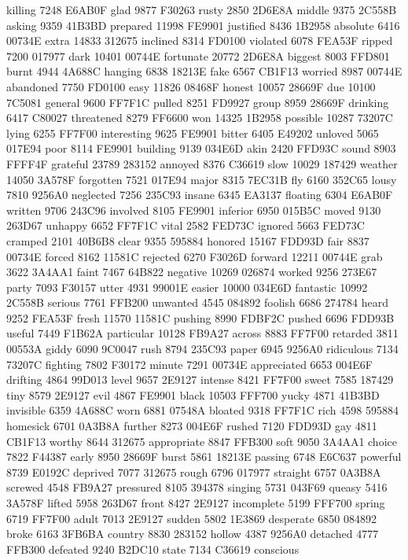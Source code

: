 killing 7248 E6AB0F glad 9877 F30263 rusty 2850 2D6E8A middle 9375
2C558B asking 9359 41B3BD prepared 11998 FE9901 justified 8436 1B2958
absolute 6416 00734E extra 14833 312675 inclined 8314 FD0100 violated
6078 FEA53F ripped 7200 017977 dark 10401 00744E fortunate 20772 2D6E8A
biggest 8003 FFD801 burnt 4944 4A688C hanging 6838 18213E fake 6567
CB1F13 worried 8987 00744E abandoned 7750 FD0100 easy 11826 08468F
honest 10057 28669F due 10100 7C5081 general 9600 FF7F1C pulled 8251
FD9927 group 8959 28669F drinking 6417 C80027 threatened 8279 FF6600
won 14325 1B2958 possible 10287 73207C lying 6255 FF7F00 interesting
9625 FE9901 bitter 6405 E49202 unloved 5065 017E94 poor 8114 FE9901
building 9139 034E6D akin 2420 FFD93C sound 8903 FFFF4F grateful 23789
283152 annoyed 8376 C36619 slow 10029 187429 weather 14050 3A578F
forgotten 7521 017E94 major 8315 7EC31B fly 6160 352C65 lousy 7810
9256A0 neglected 7256 235C93 insane 6345 EA3137 floating 6304 E6AB0F
written 9706 243C96 involved 8105 FE9901 inferior 6950 015B5C moved
9130 263D67 unhappy 6652 FF7F1C vital 2582 FED73C ignored 5663 FED73C
cramped 2101 40B6B8 clear 9355 595884 honored 15167 FDD93D fair 8837
00734E forced 8162 11581C rejected 6270 F3026D forward 12211 00744E
grab 3622 3A4AA1 faint 7467 64B822 negative 10269 026874 worked 9256
273E67 party 7093 F30157 utter 4931 99001E easier 10000 034E6D
fantastic 10992 2C558B serious 7761 FFB200 unwanted 4545 084892 foolish
6686 274784 heard 9252 FEA53F fresh 11570 11581C pushing 8990 FDBF2C
pushed 6696 FDD93B useful 7449 F1B62A particular 10128 FB9A27 across
8883 FF7F00 retarded 3811 00553A giddy 6090 9C0047 rush 8794 235C93
paper 6945 9256A0 ridiculous 7134 73207C fighting 7802 F30172 minute
7291 00734E appreciated 6653 004E6F drifting 4864 99D013 level 9657
2E9127 intense 8421 FF7F00 sweet 7585 187429 tiny 8579 2E9127 evil 4867
FE9901 black 10503 FFF700 yucky 4871 41B3BD invisible 6359 4A688C worn
6881 07548A bloated 9318 FF7F1C rich 4598 595884 homesick 6701 0A3B8A
further 8273 004E6F rushed 7120 FDD93D gay 4811 CB1F13 worthy 8644
312675 appropriate 8847 FFB300 soft 9050 3A4AA1 choice 7822 F44387
early 8950 28669F burst 5861 18213E passing 6748 E6C637 powerful 8739
E0192C deprived 7077 312675 rough 6796 017977 straight 6757 0A3B8A
screwed 4548 FB9A27 pressured 8105 394378 singing 5731 043F69 queasy
5416 3A578F lifted 5958 263D67 front 8427 2E9127 incomplete 5199 FFF700
spring 6719 FF7F00 adult 7013 2E9127 sudden 5802 1E3869 desperate 6850
084892 broke 6163 3FB6BA country 8830 283152 hollow 4387 9256A0
detached 4777 FFB300 defeated 9240 B2DC10 state 7134 C36619 conscious
